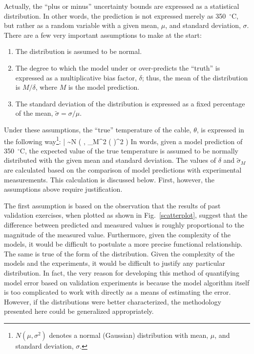 Actually, the ``plus or minus'' uncertainty bounds are expressed as a statistical distribution. In other words, the
prediction is not expressed merely as 350~$^\circ$C, but rather as a random variable with a given mean, $\mu$, and standard
deviation, $\sigma$. There are a few very important assumptions to make at the start:
\begin{enumerate}
\item The distribution is assumed to be normal.
\item The degree to which the model under or over-predicts the ``truth'' is expressed as a multiplicative bias factor, $\delta$; thus,
the mean of the distribution is $M/\delta$, where $M$ is the model prediction.
\item The standard deviation of the distribution is expressed as a fixed percentage of the mean,
$\widetilde{\sigma}=\sigma/\mu$.
\end{enumerate}
Under these assumptions, the ``true'' temperature of the cable, $\theta$, is expressed in the
following way\footnote{$N(\mu,\sigma^2)$ denotes a normal (Gaussian) distribution
with mean, $\mu$, and standard deviation, $\sigma$.}:
\be
   \theta \; |  \sim N \left(  \; , \; \widetilde{\sigma}_M^2
   \left(  \right)^2 \right) \label{truthexample}
\ee
In words, given a model prediction of 350~$^\circ$C, the expected value of the true temperature is assumed to be normally distributed
with the given mean and standard deviation. The values of $\delta$ and $\widetilde{\sigma}_M$ are calculated based on the
comparison of model predictions with experimental measurements. This calculation is discussed below. First, however, the
assumptions above require justification.

The first assumption is based on the observation that the results of past validation exercises,
when plotted as shown in Fig.~\ref{scatterplot}, suggest
that the difference between predicted and measured values is roughly proportional to the magnitude of the measured value.
Furthermore, given the
complexity of the models, it would be difficult to postulate a more precise functional relationship.
The same is true of the form of the distribution. Given the complexity of the models and the experiments,
it would be difficult to justify
any particular distribution. In fact, the very reason for developing this method of quantifying model
error based on validation
experiments is because the model algorithm itself is too complicated to work with directly
as a means of estimating the error. However, if
the distributions were better characterized, the methodology presented here could be generalized appropriately.

